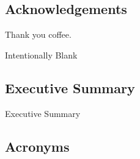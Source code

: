 \documentclass{mscreport}
\begin{document}
\newpage

\begin{center}
\section*{Acknowledgements}
\end{center}

Thank you coffee.

\newpage

\setcounter{page}{1}
\vspace*{\fill}
\begin{center}
\begin{huge}
Intentionally Blank
\end{huge}
\end{center}
\vspace{\fill}

\newpage

\begin{center}
\section*{Executive Summary}
\end{center}

Executive Summary 

\newpage
\begin{center}
\section*{Acronyms}
\end{center}
\end{document}
